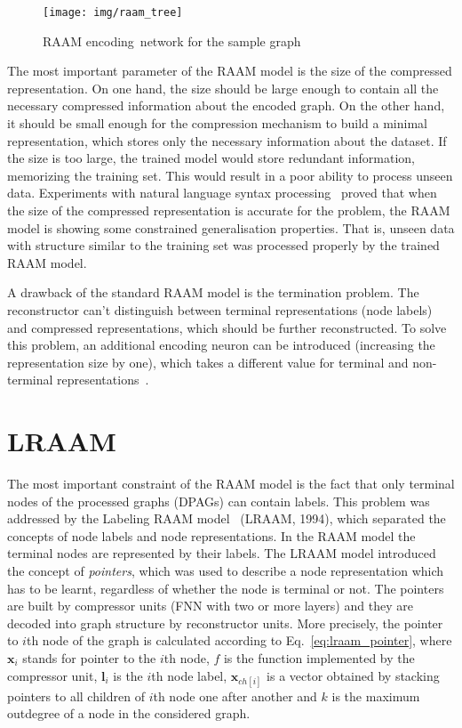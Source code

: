 \begin{figure}
\begin{center}
	\texttt{[image: img/raam\_tree]}
	\caption{RAAM encoding~network for the sample graph}
	\label{fig:raam_tree}
\end{center}
\end{figure}

The most important parameter of the RAAM model is the size of the compressed representation. On one hand, the size should be large enough to contain all the necessary compressed information about the encoded graph. On the other hand, it should be small enough for the compression mechanism to build a minimal representation, which stores only the necessary information about the dataset. If the size is too large, the trained model would store redundant information, memorizing the training set. This would result in a poor ability to process unseen data. Experiments with natural language syntax processing~\cite{pollack1990recursive} proved that when the size of the compressed representation is accurate for the problem, the RAAM model is showing some constrained generalisation properties. That is, unseen data with structure similar to the training set was processed properly by the trained RAAM model.

A drawback of the standard RAAM model is the termination problem. The reconstructor can't distinguish between terminal representations (node labels) and compressed representations, which should be further reconstructed. To solve this problem, an additional encoding neuron can be introduced (increasing the representation size by one), which takes a different value for terminal and non-terminal representations~\cite{stolcke1992tree}.

\section{LRAAM}
The most important constraint of the RAAM model is the fact that only terminal nodes of the processed graphs (DPAGs) can contain labels. This problem was addressed by the Labeling RAAM model~\cite{sperduti1994labelling} (LRAAM, 1994), which separated the concepts of node labels and node representations. In the RAAM model the terminal nodes are represented by their labels. The LRAAM model introduced the concept of \emph{pointers}, which was used to describe a node representation which has to be learnt, regardless of whether the node is terminal or not. The pointers are built by compressor units (FNN with two or more layers) and they are decoded into graph structure by reconstructor units. More precisely, the pointer to $i$th node of the graph is calculated according to Eq.~\ref{eq:lraam_pointer}, where $\bm{x}_i$ stands for pointer to the $i$th node, $f$ is the function implemented by the compressor unit, $\bm{l}_i$ is the $i$th node label, $\bm{x}_{ch[i]}$ is a vector obtained by stacking pointers to all children of $i$th node one after another and $k$ is the maximum outdegree of a node in the considered graph.

